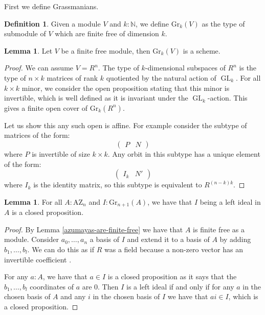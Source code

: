 \documentclass[10pt,a4paper]{article}
\theoremstyle{definition}
\newtheorem{lemma}[theorem]{Lemma}
\newtheorem{definition}[theorem]{Definition}
\newcommand{\Gr}{\mathrm{Gr}}
\DeclareMathOperator{\GL}{GL}
\newcommand{\AZ}{\mathrm{AZ}}
\newcommand{\N}{\mathbb{N}}
\begin{document}
First we define Grassmanians.

\begin{definition}
Given a module $V$ and $k:\N$, we define $\Gr_k(V)$ as the type of submodule of $V$ which are finite free of dimension $k$.
\end{definition}

\begin{lemma}\label{grassmanians-are-schemes}
Let $V$ be a finite free module, then $\Gr_k(V)$ is a scheme.
\end{lemma}

\begin{proof}
We can assume $V=R^n$. The type of $k$-dimensional subspaces of $R^n$ is the type of $n\times k$ matrices of rank $k$ quotiented by the natural action of $\GL_k$. For all $k\times k$ minor, we consider the open proposition stating that this minor is invertible, which is well defined as it is invariant under the $\GL_k$-action. This gives a finite open cover of $\Gr_k(R^n)$.

Let us show this any such open is affine. For example consider the subtype of matrices of the form:
\[\begin{pmatrix}
P & N
\end{pmatrix}\]
where $P$ is invertible of size $k\times k$. Any orbit in this subtype has a unique element of the form:
\[\begin{pmatrix}
I_k & N'
\end{pmatrix}\]
where $I_k$ is the identity matrix, so this subtype is equivalent to $R^{(n-k)k}$.
\end{proof}

\begin{lemma}\label{being-ideal-in-azumaya-closed}
For all $A:\AZ_n$ and $I:\Gr_{n+1}(A)$, we have that $I$ being a left ideal in $A$ is a closed proposition.
\end{lemma}

\begin{proof}
By Lemma \ref{azumayas-are-finite-free} we have that $A$ is finite free as a module. Consider $a_0,\hdots,a_n$ a basis of $I$ and extend it to a basis of $A$ by adding $b_1,\hdots,b_l$. We can do this as if $R$ was a field because a non-zero vector has an invertible coefficient \cite{draft}.

For any $a:A$, we have that $a\in I$ is a closed proposition as it says that the $b_1,\hdots,b_l$ coordinates of $a$ are $0$. Then $I$ is a left ideal if and only if for any $a$ in the chosen basis of $A$ and any $i$ in the chosen basis of $I$ we have that $ai\in I$, which is a closed proposition.
\end{proof}
\end{document}
